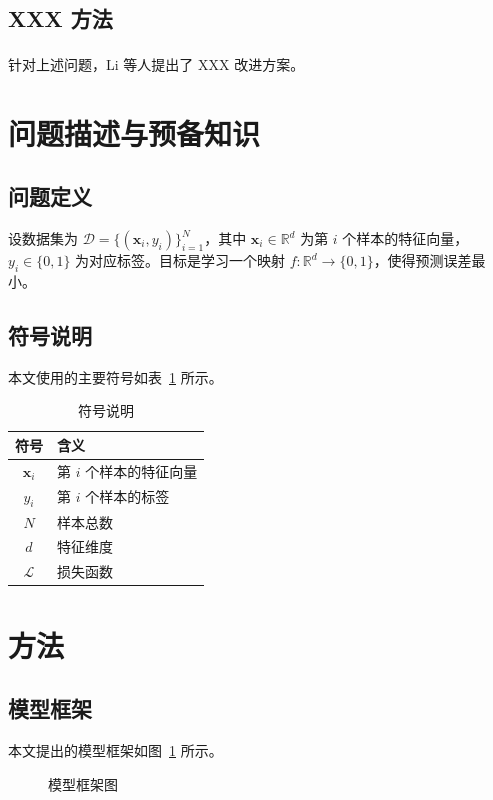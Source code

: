 \documentclass[12pt, a4paper]{ctexart}
\newcommand{\upcite}[1]{\textsuperscript{\cite{#1}}}
\begin{document}
\subsection{XXX 方法}
针对上述问题，Li 等人提出了 XXX 改进方案\upcite{ref3}。

\section{问题描述与预备知识}
\label{sec:preliminaries}

\subsection{问题定义}
设数据集为 $\mathcal{D} = \{(\bm{x}_i, y_i)\}_{i=1}^{N}$，其中 $\bm{x}_i \in \mathbb{R}^d$ 为第 $i$ 个样本的特征向量，$y_i \in \{0,1\}$ 为对应标签。目标是学习一个映射 $f: \mathbb{R}^d \rightarrow \{0,1\}$，使得预测误差最小。

\subsection{符号说明}
本文使用的主要符号如表~\ref{tab:symbols} 所示。

\begin{table}[htbp]
\centering
\caption{符号说明}
\label{tab:symbols}
\begin{tabular}{cl}
\toprule
符号 & 含义 \\
\midrule
$\bm{x}_i$ & 第 $i$ 个样本的特征向量 \\
$y_i$ & 第 $i$ 个样本的标签 \\
$N$ & 样本总数 \\
$d$ & 特征维度 \\
$\mathcal{L}$ & 损失函数 \\
\bottomrule
\end{tabular}
\end{table}

\section{方法}
\label{sec:method}

\subsection{模型框架}
本文提出的模型框架如图~\ref{fig:framework} 所示。

\begin{figure}[htbp]
\centering
\caption{模型框架图}
\label{fig:framework}
\end{figure}
\end{document}
